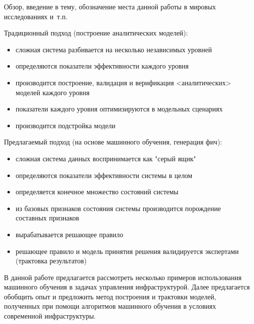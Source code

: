 
{\actuality} Обзор, введение в тему, обозначение места данной работы в
мировых исследованиях и~т.\:п.

Традиционный подход (построение аналитических моделей):
\begin{itemize}
\item  сложная система разбивается на несколько независимых уровней
\item  определяются показатели эффективности каждого уровня
\item  производится построение, валидация и верификация <аналитических> моделей каждого уровня
\item  показатели каждого уровня оптимизируются в модельных сценариях
\item  производится подстройка модели
\end{itemize}


Предлагаемый подход (на основе машинного обучения, генерация фич):
\begin{itemize}
\item  сложная система данных воспринимается как "серый ящик"
\item  определяются показатели эффективности системы в целом
\item  определяется конечное множество состояний системы
\item  из базовых признаков состояния системы производится порождение составных признаков
\item  вырабатывается решающее правило
\item  решающее правило и модель принятия решения валидируется экспертами (трактовка результатов)
\end{itemize}

В данной работе предлагается рассмотреть несколько примеров использования машинного обучения в задачах управления инфраструктурой. Далее предлагается обобщить опыт и предложить метод построения и трактовки моделей, полученных при помощи алгоритмов машинного обучения в условиях современной инфраструктуры.






